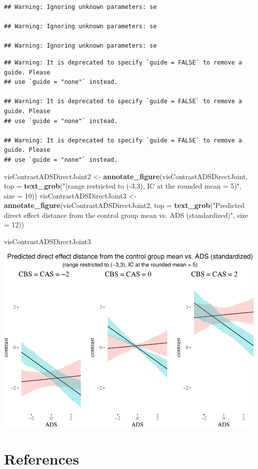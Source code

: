 \documentclass[10pt,dvipsnames,enabledeprecatedfontcommands]{scrartcl}
\newenvironment{Shaded}{\begin{snugshade}}{\end{snugshade}}
\newcommand{\KeywordTok}[1]{\textcolor[rgb]{0.13,0.29,0.53}{\textbf{#1}}}
\newcommand{\DataTypeTok}[1]{\textcolor[rgb]{0.13,0.29,0.53}{#1}}
\newcommand{\DecValTok}[1]{\textcolor[rgb]{0.00,0.00,0.81}{#1}}
\newcommand{\StringTok}[1]{\textcolor[rgb]{0.31,0.60,0.02}{#1}}
\newcommand{\NormalTok}[1]{#1}
\begin{document}
\begin{verbatim}
## Warning: Ignoring unknown parameters: se

## Warning: Ignoring unknown parameters: se

## Warning: Ignoring unknown parameters: se
\end{verbatim}

\begin{verbatim}
## Warning: It is deprecated to specify `guide = FALSE` to remove a guide. Please
## use `guide = "none"` instead.

## Warning: It is deprecated to specify `guide = FALSE` to remove a guide. Please
## use `guide = "none"` instead.

## Warning: It is deprecated to specify `guide = FALSE` to remove a guide. Please
## use `guide = "none"` instead.
\end{verbatim}

\begin{Shaded}
\begin{Highlighting}[]
\NormalTok{visContrastADSDirectJoint2 <-}\StringTok{ }\KeywordTok{annotate_figure}\NormalTok{(visContrastADSDirectJoint, }
                                        \DataTypeTok{top =} \KeywordTok{text_grob}\NormalTok{(}\StringTok{"(range restricted to (-3,3), IC at the rounded mean = 5)"}\NormalTok{,}
                                                        \DataTypeTok{size =} \DecValTok{10}\NormalTok{))}
\NormalTok{visContrastADSDirectJoint3 <-}\StringTok{ }\KeywordTok{annotate_figure}\NormalTok{(visContrastADSDirectJoint2, }
                                        \DataTypeTok{top =} \KeywordTok{text_grob}\NormalTok{(}\StringTok{"Predicted direct effect distance from the control group mean vs. ADS (standardized)"}\NormalTok{,}
                                                        \DataTypeTok{size =} \DecValTok{12}\NormalTok{))}

\NormalTok{visContrastADSDirectJoint3}
\end{Highlighting}
\end{Shaded}

\begin{center}\includegraphics[width=1\linewidth]{bayesianReport3_files/figure-latex/unnamed-chunk-19-1} \end{center}

\normalsize

\section*{References}\label{references}

\vspace{-3mm}
\end{document}
